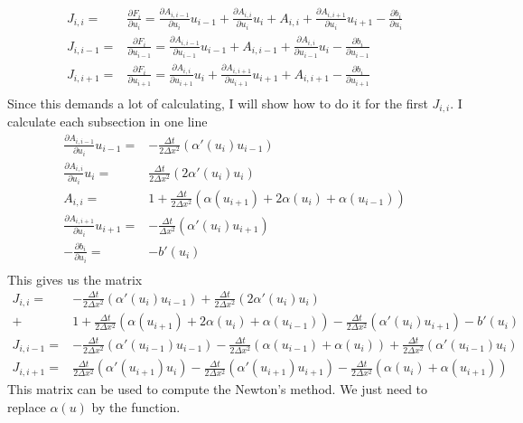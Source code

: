 \documentclass{book}
\begin{document}
\begin{align*}
J_{i,i}=& \frac{\partial F_i}{\partial u_i}=\frac{\partial A_{i,i-1}}{\partial u_i}u_{i-1}
+ \frac{\partial A_{i,i}}{\partial u_i}u_i+ A_{i,i}
+ \frac{\partial A_{i,i+1}}{\partial u_i}u_{i+1}
- \frac{\partial b_i}{\partial u_{i}}\\ 
J_{i,i-1}=& \frac{\partial F_i}{\partial u_{i-1}}=\frac{\partial A_{i,i-1}}{\partial u_{i-1}}u_{i-1}
+ A_{i,i-1}+\frac{\partial A_{i,i}}{\partial u_{i-1}}u_i
- \frac{\partial b_i}{\partial u_{i-1}}\\ 
J_{i,i+1}=& \frac{\partial F_i}{\partial u_{i+1}}= \frac{\partial A_{i,i}}{\partial u_{i+1}}u_i
+ \frac{\partial A_{i,i+1}}{\partial u_{i+1}}u_{i+1}+A_{i,i+1}
- \frac{\partial b_i}{\partial u_{i+1}}\\ 
\end{align*}
Since this demands a lot of calculating, I will show how to do it for the first
$J_{i,i}$. I calculate each subsection in one line
\begin{align*}
\frac{\partial A_{i,i-1}}{\partial u_i}u_{i-1}=&-\frac{\Delta t}{2\Delta x^2}(\alpha'(u_i)u_{i-1})\\
\frac{\partial A_{i,i}}{\partial u_i}u_i=&\frac{\Delta t}{2\Delta x^2}(2\alpha'(u_i)u_{i})\\
A_{i,i}=&1+\frac{\Delta t}{2\Delta x^2}(\alpha(u_{i+1})+2\alpha(u_i)+\alpha(u_{i-1}))\\
\frac{\partial A_{i,i+1}}{\partial u_i}u_{i+1}=&-\frac{\Delta t}{\Delta x^2}(\alpha'(u_i)u_{i+1})\\
- \frac{\partial b_i}{\partial u_{i}}=& -b'(u_i)\\
\end{align*}
This gives us the matrix
\begin{align*}
J_{i,i} =&-\frac{\Delta t}{2\Delta x^2}(\alpha'(u_i)u_{i-1})+\frac{\Delta t}{2\Delta x^2}(2\alpha'(u_i)u_{i})\\
+&1+\frac{\Delta t}{2\Delta x^2}(\alpha(u_{i+1})+2\alpha(u_i)+\alpha(u_{i-1}))-\frac{\Delta t}{2\Delta x^2}(\alpha'(u_i)u_{i+1})-b'(u_i)\\
J_{i,i-1} =&-\frac{\Delta t}{2\Delta x^2}(\alpha'(u_{i-1})u_{i-1})-\frac{\Delta t}{2\Delta x^2}(\alpha(u_{i-1})+\alpha(u_i))+\frac{\Delta t}{2\Delta x^2}(\alpha'(u_{i-1})u_{i})\\
J_{i,i+1} =&\frac{\Delta t}{2\Delta x^2}(\alpha'(u_{i+1})u_{i})-\frac{\Delta t}{2\Delta x^2}(\alpha'(u_{i+1})u_{i+1})-\frac{\Delta t}{2\Delta x^2}(\alpha(u_i)+\alpha(u_{i+1}))
\end{align*}
This matrix can be used to compute the Newton's method. We just need to replace $\alpha(u)$ by the function. 

\printindex
\end{document}
